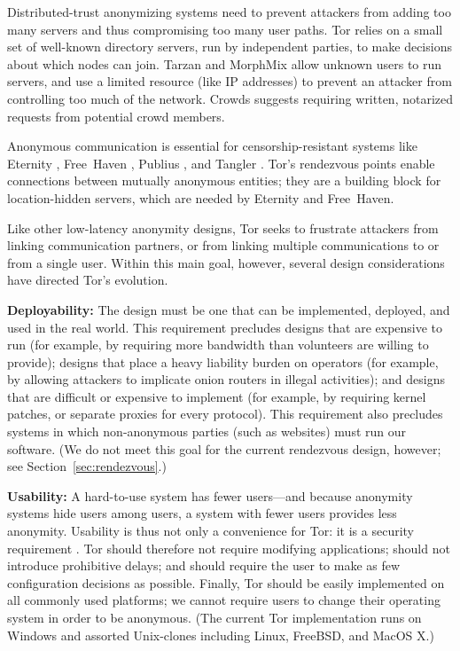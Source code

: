 \documentclass[times,10pt,twocolumn]{article}
\begin{document}
Distributed-trust anonymizing systems need to prevent attackers from
adding too many servers and thus compromising too many user paths.
Tor relies on a small set of well-known directory servers, run by
independent parties, to make decisions about which nodes can
join. Tarzan and MorphMix allow unknown users to run servers, and use
a limited resource (like IP addresses) to prevent an attacker from
controlling too much of the network.  Crowds suggests requiring
written, notarized requests from potential crowd members.

Anonymous communication is essential for censorship-resistant
systems like Eternity \cite{eternity}, Free~Haven \cite{freehaven-berk},
Publius \cite{publius}, and Tangler \cite{tangler}. Tor's rendezvous
points enable connections between mutually anonymous entities; they
are a building block for location-hidden servers, which are needed by
Eternity and Free~Haven.


\label{sec:assumptions}

Like other low-latency anonymity designs, Tor seeks to frustrate
attackers from linking communication partners, or from linking
multiple communications to or from a single user.  Within this
main goal, however, several design considerations have directed
Tor's evolution.

\textbf{Deployability:} The design must be one that can be implemented,
deployed, and used in the real world.  This requirement precludes designs
that are expensive to run (for example, by requiring more bandwidth
than volunteers are willing to provide); designs that place a heavy
liability burden on operators (for example, by allowing attackers to
implicate onion routers in illegal activities); and designs that are
difficult or expensive to implement (for example, by requiring kernel
patches, or separate proxies for every protocol).  This requirement also
precludes systems in which non-anonymous parties (such as websites)
must run our software.  (We do not meet this goal for the current
rendezvous design,
however; see Section~\ref{sec:rendezvous}.)

\textbf{Usability:} A hard-to-use system has fewer users---and because
anonymity systems hide users among users, a system with fewer users
provides less anonymity.  Usability is thus not only a convenience for Tor:
it is a security requirement \cite{econymics,back01}. Tor should
therefore not
require modifying applications; should not introduce prohibitive delays;
and should require the user to make as few configuration decisions
as possible.  Finally, Tor should be easily implemented on all commonly used
platforms; we cannot require users to change their operating system in order
to be anonymous.  (The current Tor implementation runs on Windows and
assorted Unix-clones including Linux, FreeBSD, and MacOS X.)
\end{document}
